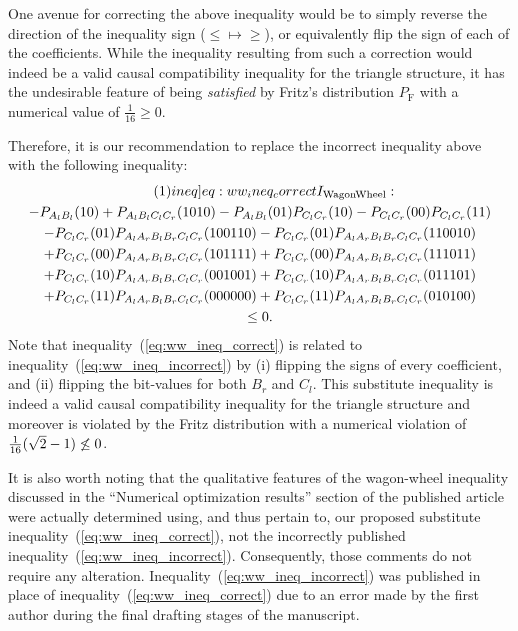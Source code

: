 \documentclass[aps, 10pt, english, twoside, pra, nofootinbib, tightenlines, longbibliography, superscriptaddress, notitlepage]{revtex4-1}
\begin{document}
    One avenue for correcting the above inequality would be to simply reverse the direction of the inequality sign ($\leq \mapsto \geq$), or equivalently flip the sign of each of the coefficients. While the inequality resulting from such a correction would indeed be a valid causal compatibility inequality for the triangle structure, it has the undesirable feature of being \textit{satisfied} by Fritz's distribution $P_{\text{F}}$ with a numerical value of $\frac{1}{16} \geq 0$.

    Therefore, it is our recommendation to replace the incorrect inequality above with the following inequality:
    \begin{equation*}
    \begin{gathered}
        \eq\label[ineq]{eq:ww_ineq_correct}
        I\tsb{WagonWheel} : \\
        -P_{A_{l}B_{l}}(10)
        +P_{A_{l}B_{l}C_{l}C_{r}}(1010)
        -P_{A_{l}B_{l}}(01) P_{C_{l}C_{r}}(10)
        -P_{C_{l}C_{r}}(00) P_{C_{l}C_{r}}(11) \\
        -P_{C_{l}C_{r}}(01) P_{A_{l}A_{r}B_{l}B_{r}C_{l}C_{r}}(100110)
        -P_{C_{l}C_{r}}(01) P_{A_{l}A_{r}B_{l}B_{r}C_{l}C_{r}}(110010) \\
        +P_{C_{l}C_{r}}(00) P_{A_{l}A_{r}B_{l}B_{r}C_{l}C_{r}}(101111)
        +P_{C_{l}C_{r}}(00) P_{A_{l}A_{r}B_{l}B_{r}C_{l}C_{r}}(111011) \\
        +P_{C_{l}C_{r}}(10) P_{A_{l}A_{r}B_{l}B_{r}C_{l}C_{r}}(001001)
        +P_{C_{l}C_{r}}(10) P_{A_{l}A_{r}B_{l}B_{r}C_{l}C_{r}}(011101) \\
        +P_{C_{l}C_{r}}(11) P_{A_{l}A_{r}B_{l}B_{r}C_{l}C_{r}}(000000)
        +P_{C_{l}C_{r}}(11) P_{A_{l}A_{r}B_{l}B_{r}C_{l}C_{r}}(010100) \\
        \leq 0.
    \end{gathered}
    \end{equation*}
    Note that inequality~(\ref{eq:ww_ineq_correct}) is related to inequality~(\ref{eq:ww_ineq_incorrect}) by (i) flipping the signs of every coefficient, and (ii) flipping the bit-values for both $B_r$ and $C_l$. This substitute inequality is indeed a valid causal compatibility inequality for the triangle structure and moreover is violated by the Fritz distribution with a numerical violation of $\frac{1}{16}(\sqrt{2} - 1) \not \leq 0$. 
    
    It is also worth noting that the qualitative features of the wagon-wheel inequality discussed in the ``Numerical optimization results'' section of the published article were actually determined using, and thus pertain to, our proposed substitute inequality~(\ref{eq:ww_ineq_correct}), not the incorrectly published inequality~(\ref{eq:ww_ineq_incorrect}). Consequently, those comments do not require any alteration. Inequality~(\ref{eq:ww_ineq_incorrect}) was published in place of inequality~(\ref{eq:ww_ineq_correct}) due to an error made by the first author during the final drafting stages of the manuscript.
\end{document}
